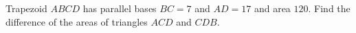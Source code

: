 Trapezoid $ABCD$ has parallel bases $BC=7$ and $AD=17$ and area $120$. Find the difference of the areas of triangles $ACD$ and $CDB$.

